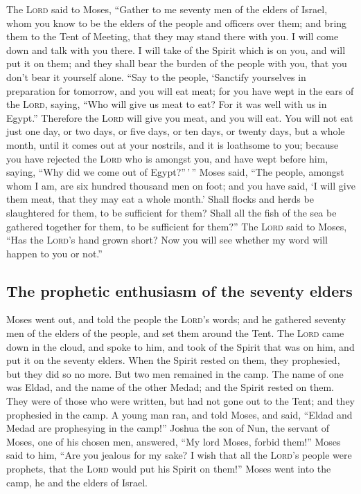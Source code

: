  The \textsc{Lord} said to Moses, ``Gather to me seventy
men of the elders of Israel, whom you know to be the elders of the
people and officers over them; and bring them to the Tent of Meeting,
that they may stand there with you.  I will come down and
talk with you there. I will take of the Spirit which is on you, and will
put it on them; and they shall bear the burden of the people with you,
that you don't bear it yourself alone.  ``Say to the
people, `Sanctify yourselves in preparation for tomorrow, and you will
eat meat; for you have wept in the ears of the \textsc{Lord}, saying,
``Who will give us meat to eat? For it was well with us in Egypt.''
Therefore the \textsc{Lord} will give you meat, and you will eat.
 You will not eat just one day, or two days, or five
days, or ten days, or twenty days,  but a whole month,
until it comes out at your nostrils, and it is loathsome to you; because
you have rejected the \textsc{Lord} who is amongst you, and have wept
before him, saying, ``Why did we come out of Egypt?''\,'\,''
 Moses said, ``The people, amongst whom I am, are six
hundred thousand men on foot; and you have said, `I will give them meat,
that they may eat a whole month.'  Shall flocks and herds
be slaughtered for them, to be sufficient for them? Shall all the fish
of the sea be gathered together for them, to be sufficient for them?''
 The \textsc{Lord} said to Moses, ``Has the
\textsc{Lord}'s hand grown short? Now you will see whether my word will
happen to you or not.''

\hypertarget{the-prophetic-enthusiasm-of-the-seventy-elders}{%
\subsection{The prophetic enthusiasm of the seventy
elders}\label{the-prophetic-enthusiasm-of-the-seventy-elders}}

 Moses went out, and told the people the \textsc{Lord}'s
words; and he gathered seventy men of the elders of the people, and set
them around the Tent.  The \textsc{Lord} came down in the
cloud, and spoke to him, and took of the Spirit that was on him, and put
it on the seventy elders. When the Spirit rested on them, they
prophesied, but they did so no more.  But two men
remained in the camp. The name of one was Eldad, and the name of the
other Medad; and the Spirit rested on them. They were of those who were
written, but had not gone out to the Tent; and they prophesied in the
camp.  A young man ran, and told Moses, and said, ``Eldad
and Medad are prophesying in the camp!''  Joshua the son
of Nun, the servant of Moses, one of his chosen men, answered, ``My lord
Moses, forbid them!''  Moses said to him, ``Are you
jealous for my sake? I wish that all the \textsc{Lord}'s people were
prophets, that the \textsc{Lord} would put his Spirit on them!''
 Moses went into the camp, he and the elders of Israel.

